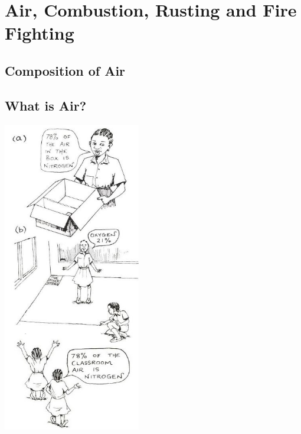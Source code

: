 \section{Air, Combustion, Rusting and Fire Fighting} 

\begin{multicols}{2}

\section*{Composition of Air} 


\subsection{What is Air?}

\begin{center}
\includegraphics[width=0.45\textwidth]{./img/source/air-comp-1.jpg}
\end{center}


\end{multicols}
